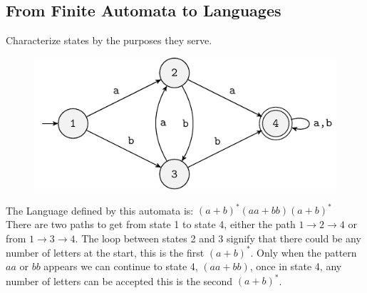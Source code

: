 \subsection{From Finite Automata to Languages}
Characterize states by the purposes they serve.\\
\begin{figure}[h!]
    \centering
    \includegraphics[width=0.6\linewidth]{lectures/figures/5-4fa.pdf}
\end{figure}
The Language defined by this automata is: \((a+b)^*(aa+bb)(a+b)^*\)\\
There are two  paths to get from state 1 to state 4, either the path $1 \rightarrow 2 \rightarrow 4$ or from $1 \rightarrow 3 \rightarrow 4$. The loop between states 2 and 3 signify that there could be any number of letters at the start, this is the first \((a+b)^*\). Only when the pattern \(aa\) or \(bb\) appears we can continue to state 4, \((aa+bb)\), once in state 4, any number of letters can be accepted this is the second \((a+b)^*\). 